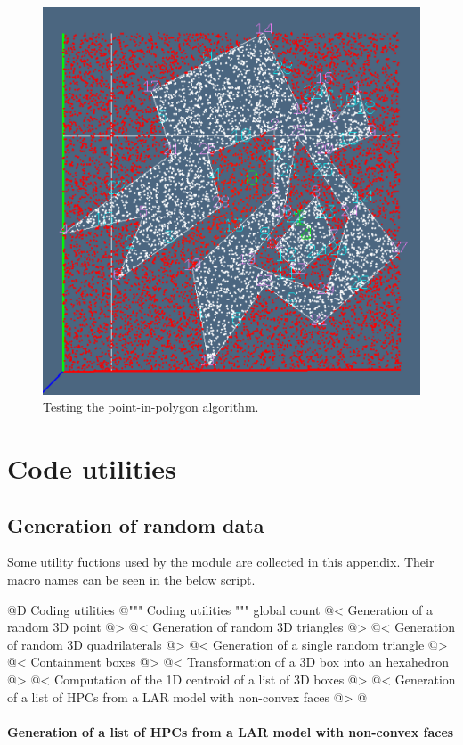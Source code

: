 \documentclass[11pt,oneside]{article}    %
\begin{document}
\begin{figure}[htbp] %
   \centering
   \includegraphics[width=0.5\linewidth]{images/pointInPolygon} 
   \caption{Testing the point-in-polygon algorithm.}
   \label{fig:pointInPolygon}
\end{figure}

\appendix
\section{Code utilities}

\subsection{Generation of random data}

Some utility fuctions used by the module are collected in this appendix. Their macro names can be seen in the below script.

@D Coding utilities
@{""" Coding utilities """
global count
@< Generation of a random 3D point @>
@< Generation of random 3D triangles @>
@< Generation of random 3D quadrilaterals @>
@< Generation of a single random triangle @>
@< Containment boxes @>
@< Transformation of a 3D box into an hexahedron @>
@< Computation of the 1D centroid of a list of 3D boxes @>
@< Generation of a list of HPCs from a LAR model with non-convex faces @>
@}


\paragraph{Generation of a list of HPCs from a LAR model with non-convex faces}
\end{document}
